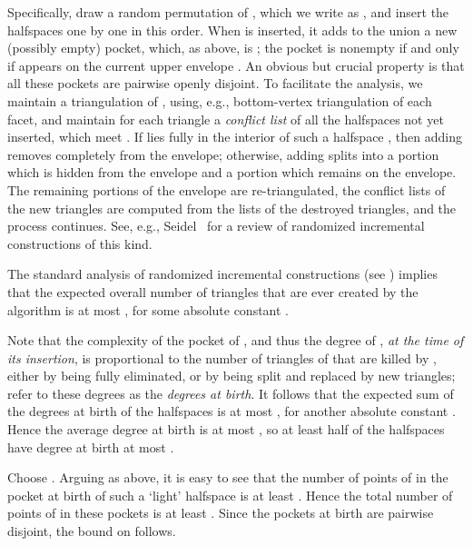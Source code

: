 \documentclass[12pt]{article}
\begin{document}
Specifically, draw a random permutation of , which we write as
, and insert the halfspaces one by one in this
order.  When  is inserted, it adds to the union a new (possibly
empty) pocket, which, as above, is ;
the pocket is nonempty if and only if  appears on the
current upper envelope . An obvious but crucial property is that
all these pockets are pairwise openly disjoint.  To facilitate the
analysis, we maintain a triangulation of , using, e.g., bottom-vertex
triangulation of each facet, and maintain for each triangle  a
{\em conflict list} of all the halfspaces  not yet inserted, which
meet . If  lies fully in the interior of such a halfspace
, then adding  removes  completely from the envelope;
otherwise, adding  splits  into a portion which is hidden
from the envelope and a portion which remains on the envelope.  The
remaining portions of the envelope are re-triangulated, the conflict
lists of the new triangles are computed from the lists of the
destroyed triangles, and the process continues. See, e.g.,
Seidel~\cite{s-barga-93} for a review of randomized incremental
constructions of this kind.

The standard analysis of randomized incremental constructions (see
\cite{s-barga-93}) implies that the expected overall number of
triangles that are ever created by the algorithm is at most , for
some absolute constant .

Note that the complexity of the pocket of , and thus the degree
of , {\em at the time of its insertion}, is proportional to the
number of triangles of  that are killed by , either by
being fully eliminated, or by being split and replaced by new
triangles; refer to these degrees as the {\em degrees at birth}.
It follows that the expected sum of the degrees at birth of the
halfspaces is at most , for another absolute constant .
Hence the average degree at birth is at most , so at least
half of the halfspaces have degree at birth at most .

Choose . Arguing as above, it is easy to see that the
number of points of  in the pocket at birth
of such a `light' halfspace is
at least . Hence the total number of points of  in
these pockets is at least . Since the pockets at
birth are pairwise disjoint, the bound on  follows.
\end{document}
